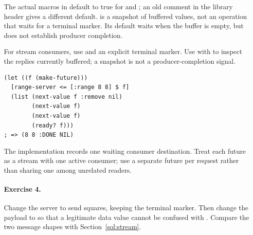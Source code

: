The actual macros in  default 
to true for  and ; an old comment
in the library header gives a different default.
 is a snapshot of buffered values, not an operation
that waits for a terminal marker. Its  default waits
when the buffer is empty, but does not establish producer completion.

For stream consumers, use  and an explicit terminal
marker. Use  with  to inspect the replies
currently buffered; a snapshot is not a producer-completion signal.

\begin{codeblock}
\begin{lstlisting}
(let ((f (make-future)))
  [range-server <= [:range 8 8] $ f]
  (list (next-value f :remove nil)
        (next-value f)
        (next-value f)
        (ready? f)))
; => (8 8 :DONE NIL)
\end{lstlisting}
\end{codeblock}

The implementation records one waiting consumer destination.
Treat each future as a stream with one active consumer; use a separate
future per request rather than sharing one among unrelated readers.

\paragraph{Exercise 4.}
Change the server to send squares, keeping the terminal marker.
Then change the payload to \code{[:value n]} so that a legitimate data
value cannot be confused with .
Compare the two message shapes with Section~\ref{sol:stream}.
